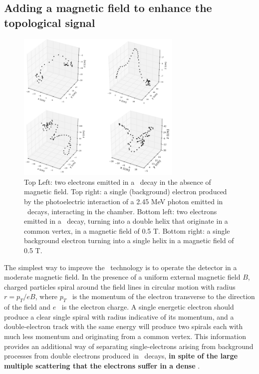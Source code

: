 \subsection*{Adding a magnetic field to enhance the topological signal}

\begin{figure}
\centering
\includegraphics[width=0.7\textwidth]{img/TRACKS2.png}
\caption{\small Top Left: two electrons emitted in a \bbonu\ decay in the absence of magnetic field. Top right: a single (background) electron produced by the photoelectric interaction of a 2.45 MeV photon emitted in \BI\ decays, interacting in the chamber. Bottom left: two  electrons emitted in a \bbonu\ decay, turning into a double helix that originate in a common vertex, in a magnetic field of 0.5 T. Bottom right: a single background electron turning into a single helix in a magnetic field of 0.5 T. } \label{fig.KF}
\end{figure}

The simplest way to improve the \HPXE\ technology is to operate the detector in a moderate magnetic field. 
In the presence of a uniform external magnetic field $B$, charged particles spiral around the field lines in circular motion with radius $r = p_T/eB$, where $p_T$~ is the momentum of the electron transverse to the direction of the field and $e$~ is the electron charge. A single energetic electron should produce a clear single spiral with radius indicative of its momentum, and a double-electron track with the same energy will produce two spirals each with much less momentum and originating from a common vertex. This information provides an additional way of separating single-electrons arising from background processes from double electrons produced in \bbonu\ decays, {\bf in spite of the large multiple scattering that the electrons suffer in a dense \HPXE}. 

